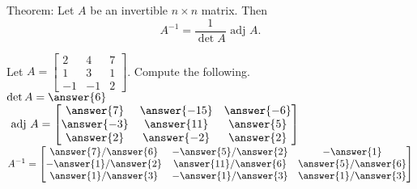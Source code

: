 \documentclass{ximera}
\newcommand{\adj}{\text{ adj }}
\begin{document}
          \begin{question} Theorem: Let $A$ be an invertible $n\times n$ matrix. Then $$A^{-1} = \dfrac{1}{\det A}  \adj  A.$$
          	
          Let $A = \begin{bmatrix} 2& 4& 7\\ 1& 3&1\\ -1&-1&2\end{bmatrix}$. Compute the following.\vspace{10pt}\\
          
          $\det A = \answer{6}$\vspace{10pt}\\
          
          $\adj A = \begin{bmatrix} 
          \answer{7} & \answer{-15} &\answer{-6}\\
          \answer{-3} & \answer{11} &\answer{5}\\
          \answer{2} & \answer{-2} &\answer{2} \end{bmatrix}$\vspace{10pt}\\
          
      
          
          $A^{-1} =   \begin{bmatrix} 
          	\answer{7}/\answer{6} & -\answer{5}/\answer{2} &-\answer{1}\\
          	-\answer{1} /\answer{2}& \answer{11}/\answer{6} &\answer{5}/\answer{6}\\
          	\answer{1}/\answer{3} & -\answer{1}/\answer{3} &\answer{1}/\answer{3} \end{bmatrix}$
          	
          	
          \end{question}	
  
\end{document}
